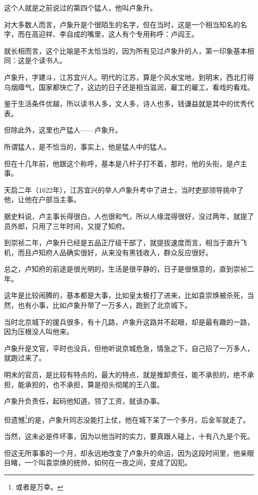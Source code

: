 \begin{multicols}{\theparacolNo}
这个人就是之前说过的第四个猛人，他叫卢象升。

对大多数人而言，卢象升是个很陌生的名字，但在当时，这是一个相当知名的名字，而在高迎祥、李自成的嘴里，这人有个专用称呼：卢阎王。

就长相而言，这个比喻是不太恰当的，因为所有见过卢象升的人，第一印象基本相同：这是个读书人。

卢象升，字建斗，江苏宜兴人。明代的江苏，算是个风水宝地，到明末，西北打得乌烟瘴气，国家都快亡了，这边的日子还是相当滋润，雇工的雇工，看戏的看戏。

鉴于生活条件优越，所以读书人多，文人多，诗人也多，钱谦益就是其中的优秀代表。

但除此外，这里也产猛人——卢象升。

所谓猛人，是不恰当的，事实上，他是猛人中的猛人。

但在十几年前，他跟这个称呼，基本是八杆子打不着，那时，他的头衔，是卢主事。

天启二年（1622年），江苏宜兴的举人卢象升考中了进士，当时吏部领导挑中了他，让他在户部当主事。

据史料说，卢主事长得很白，人也很和气，所以人缘混得很好，没过两年，就提了员外郎，只用了三年时间，又提了知府。

到崇祯二年，卢象升已经是五品正厅级干部了，就提拔速度而言，相当于直升飞机，而且卢知府人品确实很好，从来没有黑钱收入，群众反应很好。

总之，卢知府的前途是很光明的，生活是很平静的，日子是很惬意的，直到崇祯二年。

这年是比较闹腾的，基本都是大事，比如皇太极打了进来，比如袁崇焕被杀死，当然，也有小事，比如卢象升带了一万多人，跑到了北京城下。

当时北京城下的援兵很多，有十几路，卢象升这路并不起眼，却是最有趣的一路，因为压根没人叫他来。

卢象升是文官，平时也没兵，但他听说京城危急，情急之下，自己招了一万多人，就跑过来了。

明末的官员，是比较有特点的，最大的特点，就是推卸责任，能不承担的，绝不承担，能承担的，也不承担，算是彻头彻尾的王八蛋。

卢象升负责任，起码他知道，领了工资，就该办事。

但遗憾\footnote{或者是万幸。}的是，卢象升同志没能打上仗，他在城下呆了一个多月，后金军就走了。

当然，这未必是件坏事，因为以他当时的实力，要真跟人碰上，十有八九是个死。

但这无所事事的一个月，却永远地改变了卢象升的命运，因为这段时间里，他亲眼目睹，一个叫袁崇焕的统帅，如何在一夜之间，变成了囚犯。


\end{multicols}
